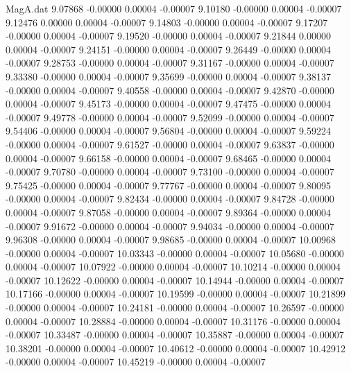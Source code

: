 \begin{filecontents}{MagA.dat}
   9.07868   -0.00000    0.00004   -0.00007
   9.10180   -0.00000    0.00004   -0.00007
   9.12476    0.00000    0.00004   -0.00007
   9.14803   -0.00000    0.00004   -0.00007
   9.17207   -0.00000    0.00004   -0.00007
   9.19520   -0.00000    0.00004   -0.00007
   9.21844    0.00000    0.00004   -0.00007
   9.24151   -0.00000    0.00004   -0.00007
   9.26449   -0.00000    0.00004   -0.00007
   9.28753   -0.00000    0.00004   -0.00007
   9.31167   -0.00000    0.00004   -0.00007
   9.33380   -0.00000    0.00004   -0.00007
   9.35699   -0.00000    0.00004   -0.00007
   9.38137   -0.00000    0.00004   -0.00007
   9.40558   -0.00000    0.00004   -0.00007
   9.42870   -0.00000    0.00004   -0.00007
   9.45173   -0.00000    0.00004   -0.00007
   9.47475   -0.00000    0.00004   -0.00007
   9.49778   -0.00000    0.00004   -0.00007
   9.52099   -0.00000    0.00004   -0.00007
   9.54406   -0.00000    0.00004   -0.00007
   9.56804   -0.00000    0.00004   -0.00007
   9.59224   -0.00000    0.00004   -0.00007
   9.61527   -0.00000    0.00004   -0.00007
   9.63837   -0.00000    0.00004   -0.00007
   9.66158   -0.00000    0.00004   -0.00007
   9.68465   -0.00000    0.00004   -0.00007
   9.70780   -0.00000    0.00004   -0.00007
   9.73100   -0.00000    0.00004   -0.00007
   9.75425   -0.00000    0.00004   -0.00007
   9.77767   -0.00000    0.00004   -0.00007
   9.80095   -0.00000    0.00004   -0.00007
   9.82434   -0.00000    0.00004   -0.00007
   9.84728   -0.00000    0.00004   -0.00007
   9.87058   -0.00000    0.00004   -0.00007
   9.89364   -0.00000    0.00004   -0.00007
   9.91672   -0.00000    0.00004   -0.00007
   9.94034   -0.00000    0.00004   -0.00007
   9.96308   -0.00000    0.00004   -0.00007
   9.98685   -0.00000    0.00004   -0.00007
  10.00968   -0.00000    0.00004   -0.00007
  10.03343   -0.00000    0.00004   -0.00007
  10.05680   -0.00000    0.00004   -0.00007
  10.07922   -0.00000    0.00004   -0.00007
  10.10214   -0.00000    0.00004   -0.00007
  10.12622   -0.00000    0.00004   -0.00007
  10.14944   -0.00000    0.00004   -0.00007
  10.17166   -0.00000    0.00004   -0.00007
  10.19599   -0.00000    0.00004   -0.00007
  10.21899   -0.00000    0.00004   -0.00007
  10.24181   -0.00000    0.00004   -0.00007
  10.26597   -0.00000    0.00004   -0.00007
  10.28884   -0.00000    0.00004   -0.00007
  10.31176   -0.00000    0.00004   -0.00007
  10.33487   -0.00000    0.00004   -0.00007
  10.35887   -0.00000    0.00004   -0.00007
  10.38201   -0.00000    0.00004   -0.00007
  10.40612   -0.00000    0.00004   -0.00007
  10.42912   -0.00000    0.00004   -0.00007
  10.45219   -0.00000    0.00004   -0.00007

\end{filecontents}
